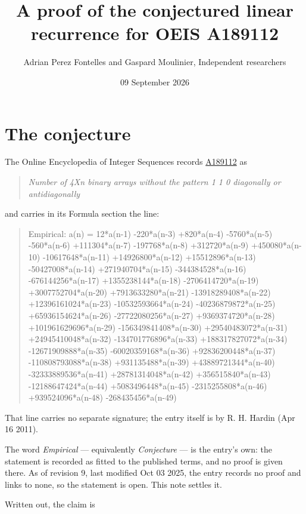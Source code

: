 \documentclass[11pt]{article}
\title{A proof of the conjectured linear recurrence for OEIS A189112}
\author{Adrian Perez Fontelles and Gaspard Moulinier, Independent researchers}
\date{09 September 2026}
\theoremstyle{definition}
\begin{document}
\maketitle
\section{The conjecture}

The Online Encyclopedia of Integer Sequences records \href{https://oeis.org/A189112}{A189112} as

\begin{quote}\itshape Number of 4Xn binary arrays without the pattern 1 1 0 diagonally or antidiagonally\end{quote}

and carries in its Formula section the line:

\begin{quote}\ttfamily Empirical: a(n) = 12*a(n-1) -220*a(n-3) +820*a(n-4) -5760*a(n-5) -560*a(n-6) +111304*a(n-7) -197768*a(n-8) +312720*a(n-9) +450080*a(n-10) -10617648*a(n-11) +14926800*a(n-12) +15512896*a(n-13) -50427008*a(n-14) +271940704*a(n-15) -344384528*a(n-16) -676144256*a(n-17) +1355238144*a(n-18) -2706414720*a(n-19) +3007752704*a(n-20) +7913633280*a(n-21) -13918289408*a(n-22) +12396161024*a(n-23) -10532593664*a(n-24) -40236879872*a(n-25) +65936154624*a(n-26) -27722080256*a(n-27) +9369374720*a(n-28) +101961629696*a(n-29) -156349841408*a(n-30) +29540483072*a(n-31) +24945410048*a(n-32) -134701776896*a(n-33) +188317827072*a(n-34) -12671909888*a(n-35) -60020359168*a(n-36) +92836200448*a(n-37) -110808793088*a(n-38) +931135488*a(n-39) +43889721344*a(n-40) -32333889536*a(n-41) +28781314048*a(n-42) +356515840*a(n-43) -12188647424*a(n-44) +5083496448*a(n-45) -2315255808*a(n-46) +939524096*a(n-48) -268435456*a(n-49)\end{quote}

That line carries no separate signature; the entry itself is by R. H. Hardin (Apr 16 2011).

The word {\itshape Empirical} --- equivalently {\itshape Conjecture} --- is the entry's own: the statement is recorded as fitted to the published terms, and no proof is given there. As of revision 9, last modified Oct 03 2025, the entry records no proof and links to none, so the statement is open. This note settles it.

Written out, the claim is
\end{document}
